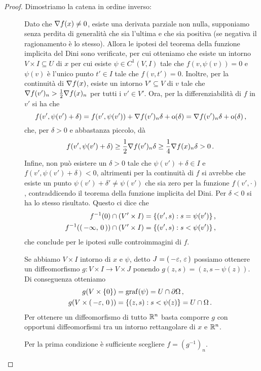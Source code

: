 \begin{proof}
	Dimostriamo la catena in ordine inverso:
	\begin{description}
		\item [] Dato che $\nabla f(x)\neq 0$, esiste una derivata parziale non nulla, supponiamo senza perdita
			di generalità che sia l'ultima e che sia positiva (se negativa il ragionamento è lo stesso).
			Allora le ipotesi del teorema della funzione implicita del Dini sono verificate, per cui otteniamo
			che esiste un intorno $V\times I\subseteq U$ di $x$ per cui esiste $\psi\in C^1(V,I)$ tale che $f(v,\psi(v))=0$ e $\psi(v)$
			è l'unico punto $t'\in I$ tale che $f(v,t')=0$.
			Inoltre, per la continuità di $\nabla f(x)$, esiste un intorno $V'\subseteq V$ di $v$ tale che $\nabla f(v')_n>\frac{1}{2}
			\nabla f(x)_n$ per tutti i $v'\in V'$. Ora, per la differenziabilità di $f$ in $v'$ si ha che %
			\[
				f(v',\psi(v')+\delta)=f(v', \psi(v'))+\nabla f(v')_n\delta+\mathrm{o}(\delta)=\nabla f(v')_n\delta+\mathrm{o}(\delta)\, \text{, }
			\]
			che, per $\delta>0$ e abbastanza piccolo, dà
			\begin{equation*}
				f(v',\psi(v')+\delta)\geq \frac{1}{2}\nabla f(v')_n\delta\geq \frac{1}{4}\nabla f(x)_n\delta>0\, \text{. }
			\end{equation*}
			Infine, non può esistere un $\delta>0$ tale che $\psi(v')+\delta\in I$ e
			$f(v',\psi(v')+\delta)<0$, altrimenti per la continuità di $f$ si avrebbe che esiste un punto $\psi(v')+\delta'\neq \psi(v')$
			che sia zero per la funzione $f(v',\cdot)$, contraddicendo il teorema della funzione implicita del Dini.
			Per $\delta<0$ si ha lo stesso risultato. Questo ci dice che 
			\begin{align*}
				f^{-1}(0)\cap (V'\times I)&=\{(v',s):s=\psi(v')\} \, \text{, }\\
				f^{-1}(\left(\,-\infty,\,0\,\right))\cap (V'\times I)&=\{(v',s):s<\psi(v')\}\, \text{, }
			\end{align*}
			che conclude per le ipotesi sulle controimmagini di $f$.
		\item [] Se abbiamo $V\times I$ intorno di $x$ e $\psi$, detto $J=\left(\,-\varepsilon,\,\varepsilon\,\right)$
			possiamo ottenere un diffeomorfismo $g:V\times I \rightarrow V\times J$ ponendo $g(z,s)=(z,s-\psi(z))$. 
			Di conseguenza otteniamo
			\begin{align*}
				g(V\times \{0\})&=\operatorname{graf}(\psi)=U\cap \partial \Omega \, \text{, }\\
				g(V\times \left(\,-\varepsilon,\,0\,\right))&=\{(z,s):s<\psi(z)\}=U\cap \Omega\, \text{. }
			\end{align*}
			Per ottenere un diffeomorfismo di tutto $\mathbb R^n$ basta comporre $g$ con opportuni diffeomorfismi tra un intorno rettangolare
			di $x$ e $\mathbb R^n$.
		\item [] Per la prima condizione è sufficiente scegliere $f=(g^{-1})_n$. %
	\end{description}
\end{proof}


